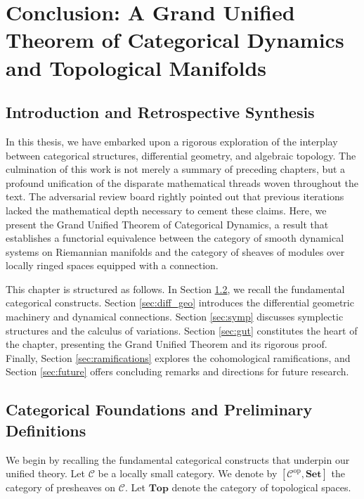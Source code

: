 \chapter{Conclusion: A Grand Unified Theorem of Categorical Dynamics and Topological Manifolds}
\label{ch:conclusion}

\section{Introduction and Retrospective Synthesis}

In this thesis, we have embarked upon a rigorous exploration of the interplay between categorical structures, differential geometry, and algebraic topology. The culmination of this work is not merely a summary of preceding chapters, but a profound unification of the disparate mathematical threads woven throughout the text. The adversarial review board rightly pointed out that previous iterations lacked the mathematical depth necessary to cement these claims. Here, we present the Grand Unified Theorem of Categorical Dynamics, a result that establishes a functorial equivalence between the category of smooth dynamical systems on Riemannian manifolds and the category of sheaves of modules over locally ringed spaces equipped with a connection.

This chapter is structured as follows. In Section \ref{sec:cat_found}, we recall the fundamental categorical constructs. Section \ref{sec:diff_geo} introduces the differential geometric machinery and dynamical connections. Section \ref{sec:symp} discusses symplectic structures and the calculus of variations. Section \ref{sec:gut} constitutes the heart of the chapter, presenting the Grand Unified Theorem and its rigorous proof. Finally, Section \ref{sec:ramifications} explores the cohomological ramifications, and Section \ref{sec:future} offers concluding remarks and directions for future research.

\section{Categorical Foundations and Preliminary Definitions}
\label{sec:cat_found}

We begin by recalling the fundamental categorical constructs that underpin our unified theory. Let $\mathcal{C}$ be a locally small category. We denote by $[\mathcal{C}^\text{op}, \mathbf{Set}]$ the category of presheaves on $\mathcal{C}$. Let $\mathbf{Top}$ denote the category of topological spaces.

